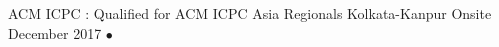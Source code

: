 \begin{cvhonors}
  \cvhonor
    {\small ACM ICPC : }
    {\small Qualified for ACM ICPC Asia Regionals Kolkata-Kanpur Onsite}
    {\small December 2017}
    {$\bullet$}
\end{cvhonors}
